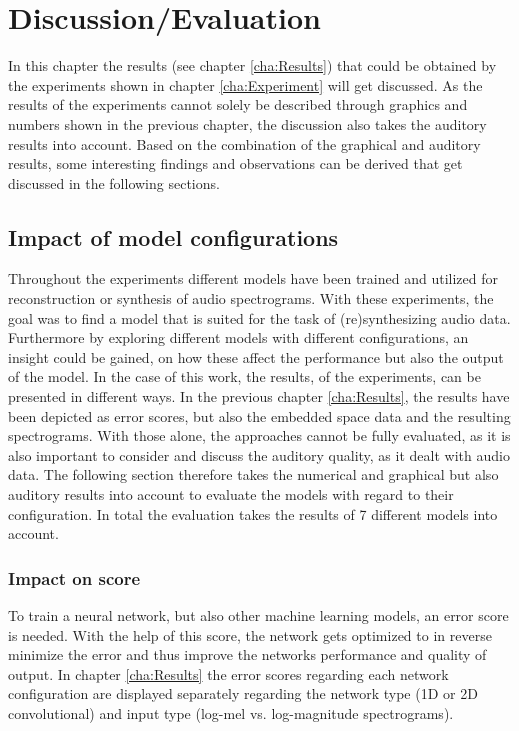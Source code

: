 \chapter{Discussion/Evaluation}
\label{cha:Discussion}

In this chapter the results (see chapter \ref{cha:Results}) that could be obtained by the experiments shown in chapter \ref{cha:Experiment} will get discussed. As the results of the experiments cannot solely be described through graphics and numbers shown in the previous chapter, the discussion also takes the auditory results into account. Based on the combination of the graphical and auditory results, some interesting findings and observations can be derived that get discussed in the following sections.


\section{Impact of model configurations}
Throughout the experiments different models have been trained and utilized for reconstruction or synthesis of audio spectrograms. With these experiments, the goal was to find a model that is suited for the task of (re)synthesizing audio data. Furthermore by exploring different models with different configurations, an insight could be gained, on how these affect the performance but also the output of the model. In the case of this work, the results, of the experiments, can be presented in different ways. In the previous chapter \ref{cha:Results}, the results have been depicted as error scores, but also the embedded space data and the resulting spectrograms. With those alone, the approaches cannot be fully evaluated, as it is also important to consider and discuss the auditory quality, as it dealt with audio data. The following section therefore takes the numerical and graphical but also auditory results into account to evaluate the models with regard to their configuration. In total the evaluation takes the results of 7 different models into account.

\subsection{Impact on score}
\label{subsec:disc_conf_score}
To train a neural network, but also other machine learning models, an error score is needed. With the help of this score, the network gets optimized to in reverse minimize the error and thus improve the networks performance and quality of output. In chapter \ref{cha:Results} the error scores regarding each network configuration are displayed separately regarding the network type (1D or 2D convolutional) and input type (log-mel vs. log-magnitude spectrograms).

